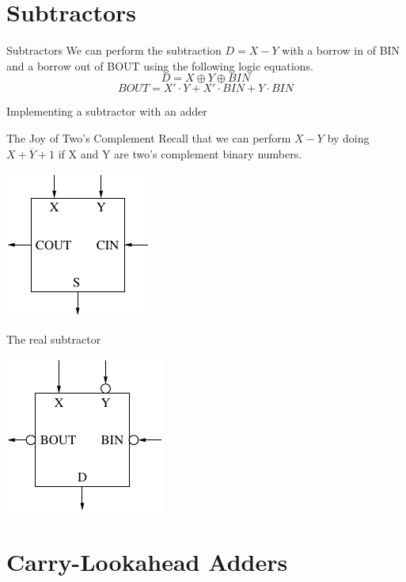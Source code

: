 \section{Subtractors}

\begin{frame}{Subtractors}
  We can perform the subtraction $D = X - Y$ with a borrow in of BIN and a borrow out of BOUT using the following logic equations.\\
  $$D = X \oplus Y \oplus BIN$$
  $$BOUT = X' \cdot Y + X' \cdot BIN + Y \cdot BIN$$
\end{frame}

\begin{frame}{Implementing a subtractor with an adder}
  \begin{block}{The Joy of Two's Complement}
    Recall that we can perform $X - Y$ by doing $X + \overline{Y} + 1$ if X and Y are two's complement binary numbers.
  \end{block}
  \begin{center}
    \includegraphics{FullAdderSchematic}
  \end{center}
\end{frame}

\begin{frame}{The real subtractor}
  \begin{center}
    \includegraphics{SubtractorSchematic}
  \end{center}
\end{frame}

\section{Carry-Lookahead Adders}

